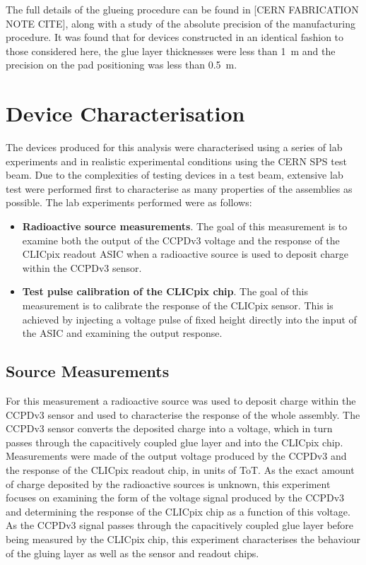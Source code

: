 The full details of the glueing procedure can be found in [CERN FABRICATION NOTE CITE], along with a study of the absolute precision of the manufacturing procedure.  It was found that for devices constructed in an identical fashion to those considered here, the glue layer thicknesses were less than 1~{\mu}m and the precision on the pad positioning was less than 0.5~{\mu}m.  


\section{Device Characterisation}
The devices produced for this analysis were characterised using a series of lab experiments and in realistic experimental conditions using the CERN SPS test beam.  Due to the complexities of testing devices in a test beam, extensive lab test were performed first to characterise as many properties of the assemblies as possible.  The lab experiments performed were as follows:

\begin{itemize}
\item \textbf{Radioactive source measurements}.  The goal of this measurement is to examine both the output of the CCPDv3 voltage and the response of the CLICpix readout ASIC when a radioactive source is used to deposit charge within the CCPDv3 sensor.  
\item \textbf{Test pulse calibration of the CLICpix chip}.  The goal of this measurement is to calibrate the response of the CLICpix sensor.  This is achieved by injecting a voltage pulse of fixed height directly into the input of the ASIC and examining the output response.  
\end{itemize} 


\subsection{Source Measurements}
\label{sec:source}
For this measurement a radioactive source was used to deposit charge within the CCPDv3 sensor and used to characterise the response of the whole assembly.  The CCPDv3 sensor converts the deposited charge into a voltage, which in turn passes through the capacitively coupled glue layer and into the CLICpix chip.  Measurements were made of the output voltage produced by the CCPDv3 and the response of the CLICpix readout chip, in units of ToT.  As the exact amount of charge deposited by the radioactive sources is unknown, this experiment focuses on examining the form of the voltage signal produced by the CCPDv3 and determining the response of the CLICpix chip as a function of this voltage.  As the CCPDv3 signal passes through the capacitively coupled glue layer before being measured by the CLICpix chip, this experiment characterises the behaviour of the gluing layer as well as the sensor and readout chips.

